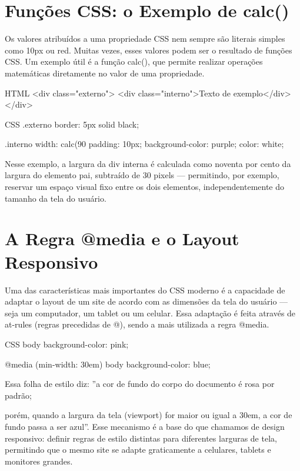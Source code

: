\section{Funções CSS: o Exemplo de calc()}

Os valores atribuídos a uma propriedade CSS nem sempre são literais simples como 10px ou red. Muitas vezes, esses valores podem ser o resultado de funções CSS. Um exemplo útil é a função calc(), que permite realizar operações matemáticas diretamente no valor de uma propriedade.

\begin{codebox}{HTML}
<div class="externo">
  <div class="interno">Texto de exemplo</div>
</div>
\end{codebox}

\begin{codebox}{CSS}
.externo {
  border: 5px solid black;
}

.interno {
  width: calc(90%
  padding: 10px;
  background-color: purple;
  color: white;
}
\end{codebox}

Nesse exemplo, a largura da div interna é calculada como noventa por cento da largura do elemento pai, subtraído de 30 pixels — permitindo, por exemplo, reservar um espaço visual fixo entre os dois elementos, independentemente do tamanho da tela do usuário.

\section{A Regra @media e o Layout Responsivo}

Uma das características mais importantes do CSS moderno é a capacidade de adaptar o layout de um site de acordo com as dimensões da tela do usuário — seja um computador, um tablet ou um celular. Essa adaptação é feita através de at-rules (regras precedidas de @), sendo a mais utilizada a regra @media.

\begin{codebox}{CSS}
body {
  background-color: pink;
}



@media (min-width: 30em) {
  body {
    background-color: blue;
  }
}

   Essa folha de estilo diz: ”a cor de fundo do corpo do documento é rosa por padrão;
\end{codebox}

porém, quando a largura da tela (viewport) for maior ou igual a 30em, a cor de fundo passa a ser azul”. Esse mecanismo é a base do que chamamos de design responsivo: definir regras de estilo distintas para diferentes larguras de tela, permitindo que o mesmo site se adapte graticamente a celulares, tablets e monitores grandes.

